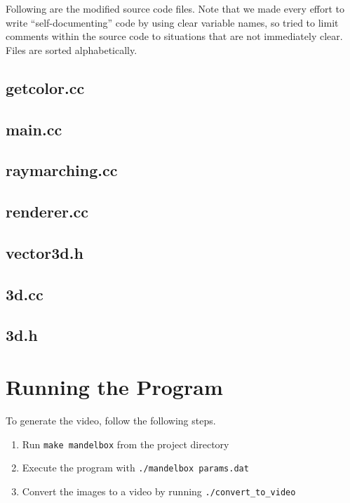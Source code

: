 \documentclass[11pt]{article}
\begin{document}
Following are the modified source code files. Note that we made every effort to write ``self-documenting'' code by using clear variable names, so tried to limit comments within the source code to situations that are not immediately clear. Files are sorted alphabetically.

\subsection{getcolor.cc}


\subsection{main.cc}


\subsection{raymarching.cc}


\subsection{renderer.cc}


\subsection{vector3d.h}


\subsection{3d.cc}


\subsection{3d.h}


\section{Running the Program}
To generate the video, follow the following steps.
\begin{enumerate}
\item Run \texttt{make mandelbox} from the project directory
\item Execute the program with \texttt{./mandelbox params.dat}
\item Convert the images to a video by running \texttt{./convert\_to\_video}
\end{enumerate}
\end{document}
